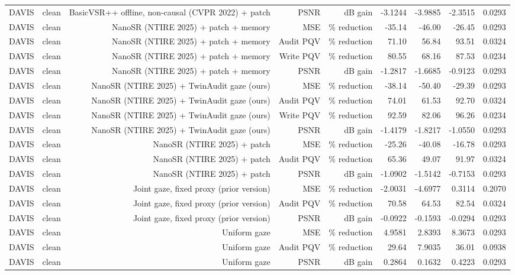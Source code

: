 \begin{table}[t]
\begin{tabular}{llrrrrrrr}
DAVIS & clean & BasicVSR++ offline, non-causal (CVPR 2022) + patch & PSNR & dB gain & -3.1244 & -3.9885 & -2.3515 & 0.0293 \\
DAVIS & clean & NanoSR (NTIRE 2025) + patch + memory & MSE & \% reduction & -35.14 & -46.00 & -26.45 & 0.0293 \\
DAVIS & clean & NanoSR (NTIRE 2025) + patch + memory & Audit PQV & \% reduction & 71.10 & 56.84 & 93.51 & 0.0324 \\
DAVIS & clean & NanoSR (NTIRE 2025) + patch + memory & Write PQV & \% reduction & 80.55 & 68.16 & 87.53 & 0.0234 \\
DAVIS & clean & NanoSR (NTIRE 2025) + patch + memory & PSNR & dB gain & -1.2817 & -1.6685 & -0.9123 & 0.0293 \\
DAVIS & clean & NanoSR (NTIRE 2025) + TwinAudit gaze (ours) & MSE & \% reduction & -38.14 & -50.40 & -29.39 & 0.0293 \\
DAVIS & clean & NanoSR (NTIRE 2025) + TwinAudit gaze (ours) & Audit PQV & \% reduction & 74.01 & 61.53 & 92.70 & 0.0324 \\
DAVIS & clean & NanoSR (NTIRE 2025) + TwinAudit gaze (ours) & Write PQV & \% reduction & 92.59 & 82.06 & 96.26 & 0.0234 \\
DAVIS & clean & NanoSR (NTIRE 2025) + TwinAudit gaze (ours) & PSNR & dB gain & -1.4179 & -1.8217 & -1.0550 & 0.0293 \\
DAVIS & clean & NanoSR (NTIRE 2025) + patch & MSE & \% reduction & -25.26 & -40.08 & -16.78 & 0.0293 \\
DAVIS & clean & NanoSR (NTIRE 2025) + patch & Audit PQV & \% reduction & 65.36 & 49.07 & 91.97 & 0.0324 \\
DAVIS & clean & NanoSR (NTIRE 2025) + patch & PSNR & dB gain & -1.0902 & -1.5142 & -0.7153 & 0.0293 \\
DAVIS & clean & Joint gaze, fixed proxy (prior version) & MSE & \% reduction & -2.0031 & -4.6977 & 0.3114 & 0.2070 \\
DAVIS & clean & Joint gaze, fixed proxy (prior version) & Audit PQV & \% reduction & 70.58 & 64.53 & 82.54 & 0.0324 \\
DAVIS & clean & Joint gaze, fixed proxy (prior version) & PSNR & dB gain & -0.0922 & -0.1593 & -0.0294 & 0.0293 \\
DAVIS & clean & Uniform gaze & MSE & \% reduction & 4.9581 & 2.8393 & 8.3673 & 0.0293 \\
DAVIS & clean & Uniform gaze & Audit PQV & \% reduction & 29.64 & 7.9035 & 36.01 & 0.0938 \\
DAVIS & clean & Uniform gaze & PSNR & dB gain & 0.2864 & 0.1632 & 0.4223 & 0.0293 \\

\end{tabular}
\end{table}
